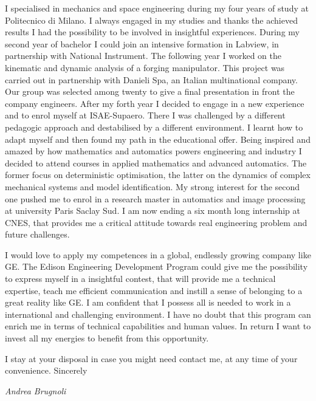 \documentclass[11pt]{letter}
\begin{document}
 I specialised in mechanics and space engineering during my four years of study at Politecnico di Milano. I always engaged in my studies and thanks the achieved results I had the possibility to be involved in insightful experiences. During my second year of bachelor I could join an intensive formation in Labview, in partnership with National Instrument. The following year I worked on the kinematic and dynamic analysis of a forging manipulator. This project was carried out in partnership with Danieli Spa, an Italian multinational company. Our group was selected among twenty to give a final presentation in front the company engineers. 
 After my forth year I decided to engage in a new experience and to enrol myself at ISAE-Supaero. There I was challenged by a different pedagogic approach and destabilised by a different environment.  I learnt how to adapt myself and then found my path in the educational offer. Being inspired and amazed by how mathematics and automatics powers engineering and industry I decided to attend courses in applied mathematics  and advanced automatics. The former focus on deterministic optimisation, the latter on the dynamics of complex mechanical systems and model identification. My strong interest for the second one pushed me to enrol in a research master in automatics and image processing at university Paris Saclay Sud. I am now ending a six month long  internship at CNES, that provides me a critical attitude towards real engineering problem and future challenges.

I would love to apply my competences in a global, endlessly growing company like GE. The Edison Engineering Development Program could give me the possibility to express myself in a insightful contest, that will provide me a technical expertise, teach me efficient communication and  instill a sense of belonging to a great reality like GE. I am confident that I possess all is needed to work in a international and challenging environment.  I have no doubt that this program can enrich me in terms of technical capabilities and human values. In return I want to invest all my energies to benefit from this opportunity.

I stay at your disposal in case you might need contact me, at any time of your convenience.
Sincerely
 \begin{center}
 \large\textit{Andrea Brugnoli}
 \end{center}
 
\end{document}
